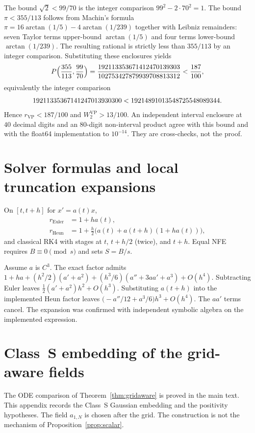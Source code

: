 \documentclass[11pt,a4paper]{article}
\theoremstyle{remark}
\newcommand{\wtwo}{W_2}
\begin{document}
The bound $\sqrt{2}<99/70$ is the integer comparison $99^2-2\cdot 70^2=1$.
The bound $\pi<355/113$ follows from Machin's formula
$\pi=16\arctan(1/5)-4\arctan(1/239)$ together with Leibniz remainders: seven
Taylor terms upper-bound $\arctan(1/5)$ and four terms lower-bound
$\arctan(1/239)$. The resulting rational is strictly less than $355/113$ by
an integer comparison. Substituting these enclosures yields
\begin{equation}
  P\Bigl(\frac{355}{113},\frac{99}{70}\Bigr)
  =\frac{192113353671412470139303}{102753427879939708813312}
  <\frac{187}{100},
\end{equation}
equivalently the integer comparison
\begin{equation}
  19211335367141247013930300<19214891013548725548089344.
\end{equation}
Hence $r_{\mathrm{VP}}<187/100$ and $\wtwo^{\mathrm{VP}}>13/100$.
An independent interval enclosure at $40$ decimal digits and an $80$-digit
non-interval product agree with this bound and with the float64
implementation to $10^{-14}$. They are cross-checks, not the proof.

\section{Solver formulas and local truncation expansions}
\label{app:solvers}

On $[t,t+h]$ for $x'=a(t)x$,
\begin{align}
  r_{\mathrm{Euler}}&=1+ha(t),\\
  r_{\mathrm{Heun}}&=1+\tfrac h2\bigl(a(t)+a(t+h)(1+ha(t))\bigr),
\end{align}
and classical RK4 with stages at $t$, $t+h/2$ (twice), and $t+h$. Equal NFE
requires $B\equiv 0\pmod s$ and sets $S=B/s$.

Assume $a$ is $C^3$. The exact factor admits
$1+ha+(h^2/2)(a'+a^2)+(h^3/6)(a''+3aa'+a^3)+O(h^4)$. Subtracting Euler
leaves $\tfrac12(a'+a^2)h^2+O(h^3)$. Substituting $a(t+h)$ into the
implemented Heun factor leaves $\bigl(-a''/12+a^3/6\bigr)h^3+O(h^4)$. The
$aa'$ terms cancel. The expansion was confirmed with independent symbolic
algebra on the implemented expression.

\section{Class~S embedding of the grid-aware fields}
\label{app:p4p1}

The ODE comparison of Theorem~\ref{thm:gridaware} is proved in the main
text. This appendix records the Class~S Gaussian embedding and the
positivity hypotheses. The field $a_{1,N}$ is chosen after the grid. The
construction is not the mechanism of Proposition~\ref{prop:scalar}.
\end{document}
